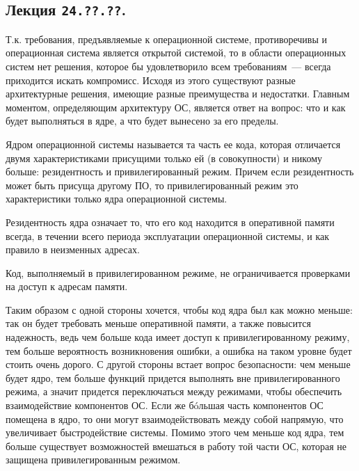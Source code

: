 \subsection{%
  Лекция \texttt{24.??.??}.%
}


Т.к. требования, предъявляемые к операционной системе, противоречивы и
операционная система является открытой системой, то в области операционных
систем нет  решения, которое бы удовлетворило всем
требованиям~--- всегда приходится искать компромисс. Исходя из этого существуют
разные архитектурные решения, имеющие разные преимущества и недостатки. Главным
моментом, определяющим архитектуру ОС, является ответ на вопрос: что и как будет
выполняться в ядре, а что будет вынесено за его пределы.

\begin{definition}
  Ядром операционной системы называется та часть ее кода, которая отличается
  двумя характеристиками присущими только ей (в совокупности) и никому больше:
  резидентность и привилегированный режим. Причем если резидентность может быть
  присуща другому ПО, то привилегированный режим это характеристики только ядра
  операционной системы.
\end{definition}

\begin{definition}
  Резидентность ядра означает то, что его код находится в оперативной памяти
  всегда, в течении всего периода эксплуатации операционной системы, и как
  правило в неизменных адресах.
\end{definition}

\begin{definition}
  Код, выполняемый в привилегированном режиме, не ограничивается проверками на
  доступ к адресам памяти.   
\end{definition}

Таким образом с одной стороны хочется, чтобы код ядра был как можно меньше: так
он будет требовать меньше оперативной памяти, а также повысится надежность, ведь
чем больше кода имеет доступ к привилегированному режиму, тем больше вероятность
возникновения ошибки, а ошибка на таком уровне будет стоить очень дорого. С
другой стороны встает вопрос безопасности: чем меньше будет ядро, тем больше
функций придется выполнять вне привилегированного режима, а значит придется
переключаться между режимами, чтобы обеспечить взаимодействие компонентов ОС.
Если же б\'oльшая часть компонентов ОС помещена в ядро, то они могут
взаимодействовать между собой напрямую, что увеличивает быстродействие системы.
Помимо этого чем меньше код ядра, тем больше существует возможностей вмешаться в
работу той части ОС, которая не защищена привилегированным режимом.


